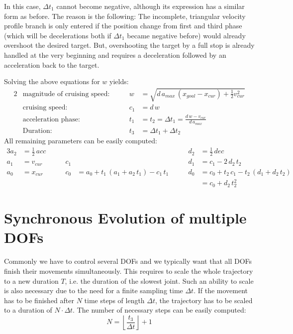 \documentclass[11pt,english]{article}
\newcommand{\xc}{x_{cur}}
\newcommand{\xg}{x_{goal}}
\newcommand{\vc}{v_{cur}}
\newcommand{\am}{a_{max}}
\newcommand{\half}{\frac{1}{2}}
\begin{document}
In this case, $\Delta t_1$ cannot become negative, although its expression has
a similar form as before. The reason is the following: The incomplete,
triangular velocity profile branch is only entered if the position change from
first and third phase (which will be decelerations both if $\Delta t_1$ became
negative before) would already overshoot the desired target. But, overshooting
the target by a full stop is already handled at the very beginning and
requires a deceleration followed by an acceleration back to the target.

Solving the above equations for $w$ yields:
\begin{alignat*}{2}
  &\text{magnitude of cruising speed:} &\qquad 
  w &= \sqrt{d \, \am \, (\xg - \xc) + \half \vc^2} \\
  &\text{cruising speed:} &\qquad c_1 &= d \, w \\
  &\text{acceleration phase:} &\qquad 
  t_1 &= t_2 = \Delta t_1 = \frac{d \, w - \vc}{d \, \am}\\
  &\text{Duration:} &\qquad t_3 &= \Delta t_1 + \Delta t_2
\end{alignat*}
All remaining parameters can be easily computed:
\begin{alignat*}{3}
  a_2 &= \half \, acc&\qquad
      &{}&\qquad
  d_2 &= \half \, dec \\
%
  a_1 &= \vc &\qquad
  c_1 &{}&\qquad
  d_1 &= c_1 - 2 \, d_2 \, t_2 \\
%
  a_0 &= \xc &\qquad
  c_0 &= a_0 + t_1 \, (a_1 + a_2 \, t_1) - c_1 \, t_1 &\qquad
  d_0 &= c_0 + t_2 \, c_1 - t_2 \, (d_1 + d_2 \, t_2) \\
  &{}&{}&{}&{}&= c_0 + d_2 \, t_2^2
\end{alignat*}

\section{Synchronous Evolution of multiple DOFs}
Commonly we have to control several DOFs and we typically want that all DOFs
finish their movements simultaneously. This requires to scale the whole
trajectory to a new duration $T$, i.e. the duration of the slowest joint. Such
an ability to scale is also necessary due to the need for a finite sampling
time $\Delta t$. If the movement has to be finished after $N$ time steps of
length $\Delta t$, the trajectory has to be scaled to a duration of $N \cdot
\Delta t$. The number of necessary steps can be easily computed:
\begin{equation*}
  N = \left\lfloor \frac{t_3}{\Delta t} \right\rfloor + 1
\end{equation*}
\end{document}
